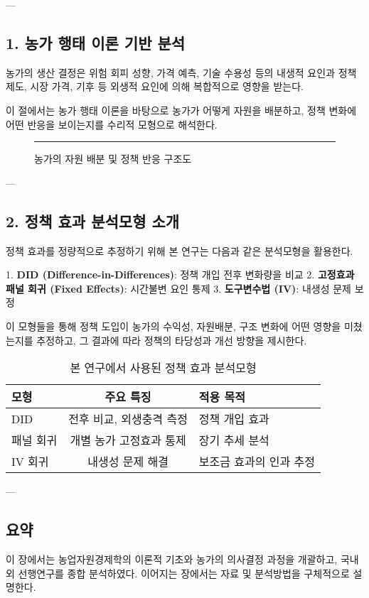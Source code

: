 ---

\subsection*{1. 농가 행태 이론 기반 분석}\label{subsec:chapter2_2_1}

농가의 생산 결정은 위험 회피 성향, 가격 예측, 기술 수용성 등의 내생적 요인과  
정책 제도, 시장 가격, 기후 등 외생적 요인에 의해 복합적으로 영향을 받는다.

이 절에서는 농가 행태 이론을 바탕으로 농가가 어떻게 자원을 배분하고,  
정책 변화에 어떤 반응을 보이는지를 수리적 모형으로 해석한다.

\begin{figure}[htbp]
  \centering
  \rule{0.75\linewidth}{5cm}
  \caption{농가의 자원 배분 및 정책 반응 구조도}\label{fig:chapter2_2}
\end{figure}

---

\subsection*{2. 정책 효과 분석모형 소개}\label{subsec:chapter2_2_2}

정책 효과를 정량적으로 추정하기 위해 본 연구는 다음과 같은 분석모형을 활용한다.

1. \textbf{DID (Difference-in-Differences)}: 정책 개입 전후 변화량을 비교  
2. \textbf{고정효과 패널 회귀 (Fixed Effects)}: 시간불변 요인 통제  
3. \textbf{도구변수법 (IV)}: 내생성 문제 보정

이 모형들을 통해 정책 도입이 농가의 수익성, 자원배분, 구조 변화에 어떤 영향을 미쳤는지를 추정하고,  
그 결과에 따라 정책의 타당성과 개선 방향을 제시한다.

\begin{table}[htbp]
  \centering
  \begin{tabular}{|l|c|l|}
    \hline
    모형 & 주요 특징 & 적용 목적 \\
    \hline
    DID & 전후 비교, 외생충격 측정 & 정책 개입 효과 \\
    패널 회귀 & 개별 농가 고정효과 통제 & 장기 추세 분석 \\
    IV 회귀 & 내생성 문제 해결 & 보조금 효과의 인과 추정 \\
    \hline
  \end{tabular}
  \caption{본 연구에서 사용된 정책 효과 분석모형}\label{tab:chapter2_2}
\end{table}

---

\subsection*{요약}\label{subsec:chapter2_2_3}

이 장에서는 농업자원경제학의 이론적 기초와 농가의 의사결정 과정을 개괄하고,  
국내외 선행연구를 종합 분석하였다. 이어지는 장에서는 자료 및 분석방법을 구체적으로 설명한다.
